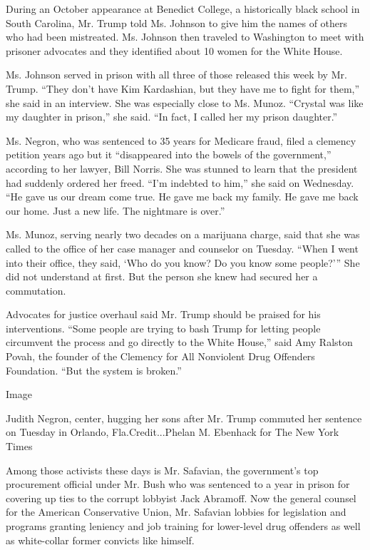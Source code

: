During an October appearance at Benedict College, a historically black
school in South Carolina, Mr. Trump told Ms. Johnson to give him the
names of others who had been mistreated. Ms. Johnson then traveled to
Washington to meet with prisoner advocates and they identified about 10
women for the White House.

Ms. Johnson served in prison with all three of those released this week
by Mr. Trump. ``They don't have Kim Kardashian, but they have me to
fight for them,'' she said in an interview. She was especially close to
Ms. Munoz. ``Crystal was like my daughter in prison,'' she said. ``In
fact, I called her my prison daughter.''

Ms. Negron, who was sentenced to 35 years for Medicare fraud, filed a
clemency petition years ago but it ``disappeared into the bowels of the
government,'' according to her lawyer, Bill Norris. She was stunned to
learn that the president had suddenly ordered her freed. ``I'm indebted
to him,'' she said on Wednesday. ``He gave us our dream come true. He
gave me back my family. He gave me back our home. Just a new life. The
nightmare is over.''

Ms. Munoz, serving nearly two decades on a marijuana charge, said that
she was called to the office of her case manager and counselor on
Tuesday. ``When I went into their office, they said, `Who do you know?
Do you know some people?''' She did not understand at first. But the
person she knew had secured her a commutation.

Advocates for justice overhaul said Mr. Trump should be praised for his
interventions. ``Some people are trying to bash Trump for letting people
circumvent the process and go directly to the White House,'' said Amy
Ralston Povah, the founder of the Clemency for All Nonviolent Drug
Offenders Foundation. ``But the system is broken.''

Image

Judith Negron, center, hugging her sons after Mr. Trump commuted her
sentence on Tuesday in Orlando, Fla.Credit...Phelan M. Ebenhack for The
New York Times

Among those activists these days is Mr. Safavian, the government's top
procurement official under Mr. Bush who was sentenced to a year in
prison for covering up ties to the corrupt lobbyist Jack Abramoff. Now
the general counsel for the American Conservative Union, Mr. Safavian
lobbies for legislation and programs granting leniency and job training
for lower-level drug offenders as well as white-collar former convicts
like himself.


